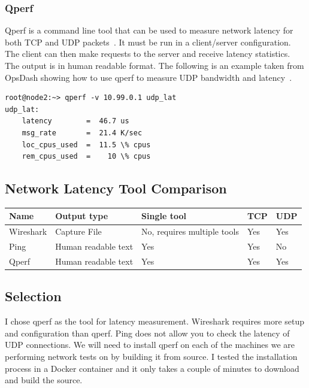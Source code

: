 \documentclass[10pt,letterpaper,onecolumn,draftclsnofoot]{IEEEtran}
\begin{document}
\subsubsection{Qperf}
Qperf is a command line tool that can be used to measure network latency for both TCP and UDP packets~\cite{qperf}.
It must be run in a client/server configuration.
The client can then make requests to the server and receive latency statistics.
The output is in human readable format.
The following is an example taken from OpsDash showing how to use qperf to measure UDP bandwidth and latency~\cite{qperf-example}.
\begin{lstlisting}[caption = Using qperf to measure UDP latency,basicstyle=\ttfamily]
root@node2:~> qperf -v 10.99.0.1 udp_lat
udp_lat:
    latency        =  46.7 us
    msg_rate       =  21.4 K/sec
    loc_cpus_used  =  11.5 \% cpus
    rem_cpus_used  =    10 \% cpus
\end{lstlisting}


\subsection{Network Latency Tool Comparison}

\begin{center}
	\begin{tabular}{| l | l | l | l | l |}
		\hline
		Name & Output type & Single tool & TCP & UDP \\ \hline
		Wireshark & Capture File & No, requires multiple tools & Yes & Yes \\ \hline
		Ping & Human readable text & Yes & Yes & No \\ \hline
		Qperf & Human readable text & Yes & Yes & Yes \\ \hline
	\end{tabular}
\end{center}

\subsection{Selection}
I chose qperf as the tool for latency measurement.
Wireshark requires more setup and configuration than qperf.
Ping does not allow you to check the latency of UDP connections.
We will need to install qperf on each of the machines we are performing network tests on by building it from source.
I tested the installation process in a Docker container and it only takes a couple of minutes to download and build the source.
\end{document}
